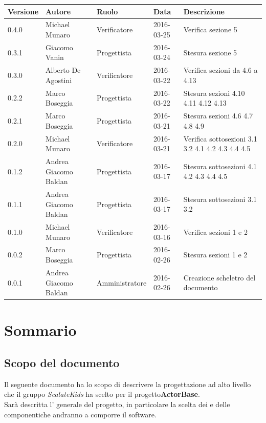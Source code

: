 \documentclass{scalatekids-article}
\begin{document}
\begin{center}
  \begin{tabular}{| l | l | l | l | p{5cm} |}
    \hline
    Versione & Autore & Ruolo & Data & Descrizione \\
    \hline
    0.4.0 & Michael Munaro & Verificatore & 2016-03-25 & Verifica sezione 5\\
    \hline
    0.3.1 & Giacomo Vanin & Progettista & 2016-03-24 & Stesura sezione 5\\
    \hline
    0.3.0 & Alberto De Agostini & Verificatore & 2016-03-22 & Verifica sezioni da 4.6 a 4.13\\
    \hline
    0.2.2 & Marco Boseggia & Progettista & 2016-03-22 & Stesura sezioni 4.10 4.11 4.12 4.13\\
    \hline
    0.2.1 & Marco Boseggia & Progettista & 2016-03-21 & Stesura sezioni 4.6 4.7 4.8 4.9\\
    \hline
    0.2.0 & Michael Munaro & Verificatore & 2016-03-21 & Verifica sottosezioni 3.1 3.2 4.1 4.2 4.3 4.4 4.5\\
    \hline
    0.1.2 & Andrea Giacomo Baldan & Progettista & 2016-03-17 & Stesura sottosezioni 4.1 4.2 4.3 4.4 4.5\\
    \hline
    0.1.1 & Andrea Giacomo Baldan & Progettista & 2016-03-17 & Stesura sottosezioni 3.1 3.2\\
    \hline
    0.1.0 & Michael Munaro & Verificatore & 2016-03-16 & Verifica sezioni 1 e 2\\
    \hline
    0.0.2 & Marco Boseggia & Progettista & 2016-02-26 & Stesura sezioni 1 e 2\\
    \hline
    0.0.1 & Andrea Giacomo Baldan & Amministratore & 2016-02-26 & Creazione scheletro del documento\\
    \hline
  \end{tabular}
\end{center}
\tableofcontents
\newpage
{}

\section{Sommario}

\subsection{Scopo del documento}

Il seguente documento ha lo scopo di descrivere la progettazione ad alto livello
che il gruppo \textit{ScalateKids} ha scelto per il
progetto\textbf{ActorBase}.\\  Sarà descritta l' generale
del progetto, in particolare  la scelta dei  e delle
componentiche andranno a comporre il software.
\end{document}
